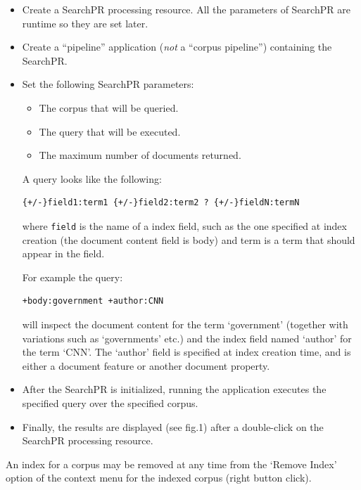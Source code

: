 \begin{itemize}
%
\item
Create a SearchPR processing resource. All the parameters of SearchPR
are runtime so they are set later.
%
\item
Create a ``pipeline'' application ({\em not} a ``corpus pipeline'') containing
the SearchPR.
%
\item
Set the following SearchPR parameters:
 \begin{itemize}
 \item
 The corpus that will be queried.
 \item
 The query that will be executed.
 \item
 The maximum number of documents returned.
 \end{itemize}

A query looks like the following:

\begin{verbatim}
{+/-}field1:term1 {+/-}field2:term2 ? {+/-}fieldN:termN
\end{verbatim}
where \texttt{field} is the name of a index field, such as the one specified at
index creation (the document content field is body) and term is a term
that should appear in the field.

For example the query:
\begin{verbatim}
+body:government +author:CNN
\end{verbatim}
will inspect the document content for the term `government' (together
with variations such as `governments' etc.) and the index field named
`author' for the term `CNN'. The `author' field is specified at index
creation time, and is either a document feature or another document
property.

%
\item
After the SearchPR is initialized, running the application executes
the specified query over the specified corpus.

%
\item
Finally, the results are displayed (see fig.1) after a double-click on
the SearchPR processing resource.
%
\end{itemize}


An index for a corpus may be removed at any time from the `Remove
Index' option of the context menu for the indexed corpus (right button
click).



